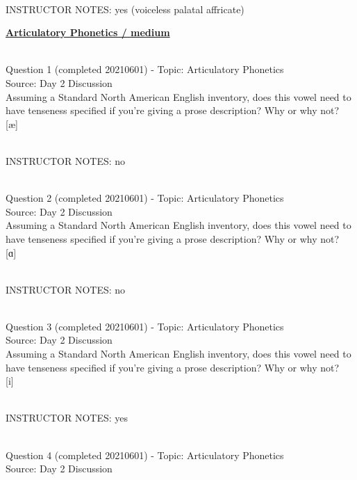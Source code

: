 \documentclass[12pt]{article}
\begin{document}
~\\
INSTRUCTOR NOTES: yes (voiceless palatal affricate)


\newpage\textbf{\underline{\huge Articulatory Phonetics / medium\\}}

~\\

{\large Question 1} (completed 20210601) - Topic: Articulatory Phonetics\\
Source: Day 2 Discussion\\

Assuming a Standard North American English inventory, does this vowel need to have tenseness specified if you're giving a prose description? Why or why not?\\

{[æ]}


~\\
INSTRUCTOR NOTES: no


~\\

{\large Question 2} (completed 20210601) - Topic: Articulatory Phonetics\\
Source: Day 2 Discussion\\

Assuming a Standard North American English inventory, does this vowel need to have tenseness specified if you're giving a prose description? Why or why not?\\

{[ɑ]}


~\\
INSTRUCTOR NOTES: no


~\\

{\large Question 3} (completed 20210601) - Topic: Articulatory Phonetics\\
Source: Day 2 Discussion\\

Assuming a Standard North American English inventory, does this vowel need to have tenseness specified if you're giving a prose description? Why or why not?\\

{[i]}


~\\
INSTRUCTOR NOTES: yes


~\\

{\large Question 4} (completed 20210601) - Topic: Articulatory Phonetics\\
Source: Day 2 Discussion\\
\end{document}
